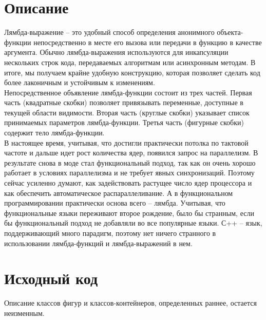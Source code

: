 \section{Описание}

Лямбда-выражение -- это удобный способ определения анонимного объекта-функции непосредственно в месте его вызова или передачи в функцию в качестве аргумента. Обычно лямбда-выражения используются для инкапсуляции нескольких строк кода, передаваемых алгоритмам или асинхронным методам. В итоге, мы получаем крайне удобную конструкцию, которая позволяет сделать код более лаконичным и устойчивым к изменениям. \\
Непосредственное объявление лямбда-функции состоит из трех частей. Первая часть (квадратные скобки) позволяет привязывать переменные, доступные в текущей области видимости. Вторая часть (круглые скобки) указывает список принимаемых параметров лямбда-функции. Третья часть (фигурные скобки) содержит тело лямбда-функции. \\
В настоящее время, учитывая, что достигли практически потолка по тактовой частоте и дальше идет рост количества ядер, появился запрос на параллелизм. В результате снова в моде стал функциональный подход, так как он очень хорошо работает в условиях параллелизма и не требует явных синхронизаций. Поэтому сейчас усиленно думают, как задействовать растущее число ядер процессора и как обеспечить автоматическое распараллеливание. А в функциональном программировании практически основа всего -- лямбда. Учитывая, что функциональные языки переживают второе рождение, было бы странным, если бы функциональный подход не добавляли во все популярные языки. С++ -- язык, поддерживающий много парадигм, поэтому нет ничего странного в использовании лямбда-функций и лямбда-выражений в нем. \\

\section{Исходный код}

Описание классов фигур и классов-контейнеров, определенных раннее, остается неизменным.\\

